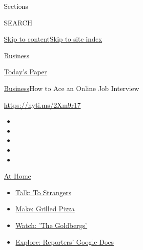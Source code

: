 Sections

SEARCH

\protect\hyperlink{site-content}{Skip to
content}\protect\hyperlink{site-index}{Skip to site index}

\href{https://www.nytimes3xbfgragh.onion/section/business}{Business}

\href{https://myaccount.nytimes3xbfgragh.onion/auth/login?response_type=cookie\&client_id=vi}{}

\href{https://www.nytimes3xbfgragh.onion/section/todayspaper}{Today's
Paper}

\href{/section/business}{Business}\textbar{}How to Ace an Online Job
Interview

\url{https://nyti.ms/2Xm9r17}

\begin{itemize}
\item
\item
\item
\item
\item
\end{itemize}

\href{https://www.nytimes3xbfgragh.onion/spotlight/at-home?action=click\&pgtype=Article\&state=default\&region=TOP_BANNER\&context=at_home_menu}{At
Home}

\begin{itemize}
\tightlist
\item
  \href{https://www.nytimes3xbfgragh.onion/2020/08/03/well/family/the-benefits-of-talking-to-strangers.html?action=click\&pgtype=Article\&state=default\&region=TOP_BANNER\&context=at_home_menu}{Talk:
  To Strangers}
\item
  \href{https://www.nytimes3xbfgragh.onion/2020/08/01/at-home/coronavirus-make-pizza-on-a-grill.html?action=click\&pgtype=Article\&state=default\&region=TOP_BANNER\&context=at_home_menu}{Make:
  Grilled Pizza}
\item
  \href{https://www.nytimes3xbfgragh.onion/2020/07/31/arts/television/goldbergs-abc-stream.html?action=click\&pgtype=Article\&state=default\&region=TOP_BANNER\&context=at_home_menu}{Watch:
  'The Goldbergs'}
\item
  \href{https://www.nytimes3xbfgragh.onion/interactive/2020/at-home/even-more-reporters-editors-diaries-lists-recommendations.html?action=click\&pgtype=Article\&state=default\&region=TOP_BANNER\&context=at_home_menu}{Explore:
  Reporters' Google Docs}
\end{itemize}

